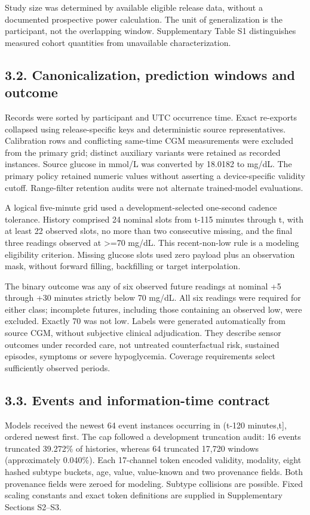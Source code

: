 \documentclass[11pt,a4paper]{article}
\begin{document}
Study size was determined by available eligible release data, without a documented prospective power calculation. The unit of generalization is the participant, not the overlapping window. Supplementary Table S1 distinguishes measured cohort quantities from unavailable characterization.

\subsection*{3.2. Canonicalization, prediction windows and outcome}
Records were sorted by participant and UTC occurrence time. Exact re-exports collapsed using release-specific keys and deterministic source representatives. Calibration rows and conflicting same-time CGM measurements were excluded from the primary grid; distinct auxiliary variants were retained as recorded instances. Source glucose in mmol/L was converted by 18.0182 to mg/dL. The primary policy retained numeric values without asserting a device-specific validity cutoff. Range-filter retention audits were not alternate trained-model evaluations.

A logical five-minute grid used a development-selected one-second cadence tolerance. History comprised 24 nominal slots from t-115 minutes through t, with at least 22 observed slots, no more than two consecutive missing, and the final three readings observed at >=70 mg/dL. This recent-non-low rule is a modeling eligibility criterion. Missing glucose slots used zero payload plus an observation mask, without forward filling, backfilling or target interpolation.

The binary outcome was any of six observed future readings at nominal +5 through +30 minutes strictly below 70 mg/dL. All six readings were required for either class; incomplete futures, including those containing an observed low, were excluded. Exactly 70 was not low. Labels were generated automatically from source CGM, without subjective clinical adjudication. They describe sensor outcomes under recorded care, not untreated counterfactual risk, sustained episodes, symptoms or severe hypoglycemia. Coverage requirements select sufficiently observed periods.

\subsection*{3.3. Events and information-time contract}
Models received the newest 64 event instances occurring in (t-120 minutes,t], ordered newest first. The cap followed a development truncation audit: 16 events truncated 39.272\% of histories, whereas 64 truncated 17,720 windows (approximately 0.040\%). Each 17-channel token encoded validity, modality, eight hashed subtype buckets, age, value, value-known and two provenance fields. Both provenance fields were zeroed for modeling. Subtype collisions are possible. Fixed scaling constants and exact token definitions are supplied in Supplementary Sections S2--S3.
\end{document}

